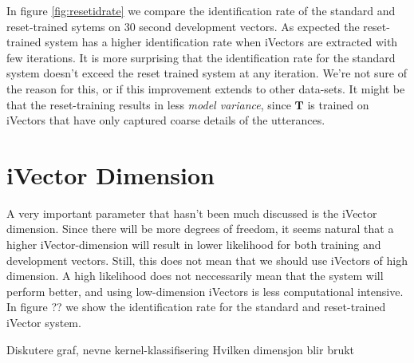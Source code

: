 In figure \ref{fig:resetidrate} we compare the identification rate of the standard and reset-trained sytems on 30 second development vectors. As expected the reset-trained system has a higher identification rate when iVectors are extracted with few iterations. It is more surprising that the identification rate for the standard system doesn't exceed the reset trained system at any iteration. We're not sure of the reason for this, or if this improvement extends to other data-sets. It might be that the reset-training results in less \emph{model variance}, since $\mathbf{T}$ is trained on iVectors that have only captured coarse details of the utterances. 

\section{iVector Dimension}

A very important parameter that hasn't been much discussed is the iVector dimension. Since there will be more degrees of freedom, it seems natural that a higher iVector-dimension will result in lower likelihood for both training and development vectors. Still, this does not mean that we should use iVectors of high dimension. A high likelihood does not neccessarily mean that the system will perform better, and using low-dimension iVectors is less computational intensive.  In figure ?? we show the identification rate for the standard and reset-trained iVector system.


Diskutere graf, nevne kernel-klassifisering
Hvilken dimensjon blir brukt


















